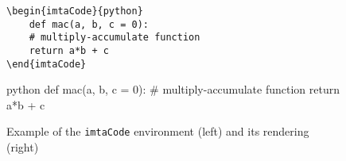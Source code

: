 \documentclass{report}
\begin{document}
\begin{figure}[!ht]
\begin{minipage}{.45\linewidth}
\renewcommand{\theFancyVerbLine}{\texttt{\textcolor{gray!150}{\normalsize \oldstylenums{\arabic{FancyVerbLine}}}}}%
\vspace{0.5\baselineskip}%
\begin{mdframed}[backgroundcolor=imtaCodeLinenosFrame, innerrightmargin=0pt, innertopmargin=0pt, innerbottommargin=0pt, linewidth=1pt]
\begin{mdframed}[backgroundcolor=imtaCodeBackground, skipabove=0pt, skipbelow=0pt, rightmargin=0pt, leftmargin=3ex, linewidth=0pt, innertopmargin=5pt, innerbottommargin=5pt, innerleftmargin=1ex]%
\begin{verbatim}
\begin{imtaCode}{python}
    def mac(a, b, c = 0):
    # multiply-accumulate function
    return a*b + c
\end{imtaCode}
\end{verbatim}
\end{mdframed}
\end{mdframed}
\end{minipage}
\hfill
\begin{minipage}{.45\linewidth}
\vspace{2em}
\begin{imtaCode}{python}
def mac(a, b, c = 0):
    # multiply-accumulate function
    return a*b + c
\end{imtaCode}
\end{minipage}
\caption{Example of the \texttt{imtaCode} environment (left) and its rendering (right)\label{fig:imtaCode}}
\end{figure}
\end{document}
